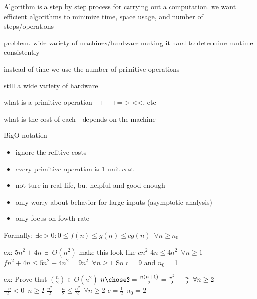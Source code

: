 \documentclass[12pt]{article}
\begin{document}
Algorithm is a step by step process for carrying out a computation. 
we want efficient algorithms to minimize time, space usage, and number of steps/operations

problem: wide variety of machines/hardware making it hard to determine runtime consistently

instead of time we use the number of primitive operations

still a wide variety of hardware 

what is a primitive operation - + - += > <<, etc

what is the cost of each - depends on the machine

BigO notation 
\begin{itemize}
\item ignore the relitive costs
\item every primitive operation is 1 unit cost
\item not ture in real life, but helpful and good enough
\item only worry about behavior for large inputs (asymptotic analysis)
\item only focus on fowth rate
\end{itemize}

Formally: $\exists c > 0 : 0 \leq f(n) \leq g(n) \leq cg(n) \enspace \forall n \geq n_{0}$

ex:
$5n^2+4n \enspace \exists \enspace O(n^2)$ make this look like $cn^2$
$4n \leq 4n^2 \enspace \forall n \geq 1$
$fn^2+4n \leq 5n^2 + 4n^2 = 9n^2 \enspace \forall n \geq 1$
So c = 9 and $n_{0}$ = 1

ex:
Prove that ${ n \choose 2} \in O(n^2)$
${n \chose 2} = \frac{n(n+1)}{2} = \frac{n^2}{2} - \frac{n}{2} \enspace \forall n \geq 2$
$\frac{-n}{2} <0 \enspace n \geq 2$
$\frac{n^2}{2} - \frac{n}{2} \leq \frac{n^2}{2} \enspace \forall n \geq 2$
$c = \frac{1}{2} \enspace n_{0} = 2$
\end{document}
